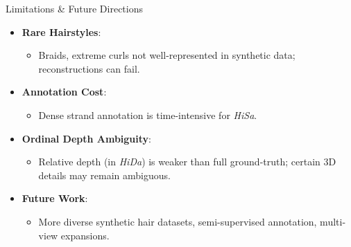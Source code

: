 \begin{frame}[t]{Limitations \& Future Directions}
    \begin{itemize}
        \item \textbf{Rare Hairstyles}:
        \begin{itemize}
            \item Braids, extreme curls not well-represented in synthetic data; reconstructions can fail.
        \end{itemize}
        \item \textbf{Annotation Cost}:
        \begin{itemize}
            \item Dense strand annotation is time-intensive for \emph{HiSa}.
        \end{itemize}
        \item \textbf{Ordinal Depth Ambiguity}:
        \begin{itemize}
            \item Relative depth (in \emph{HiDa}) is weaker than full ground-truth; certain 3D details may remain ambiguous.
        \end{itemize}
        \item \textbf{Future Work}:
        \begin{itemize}
            \item More diverse synthetic hair datasets, semi-supervised annotation, multi-view expansions.
        \end{itemize}
    \end{itemize}
\end{frame}
